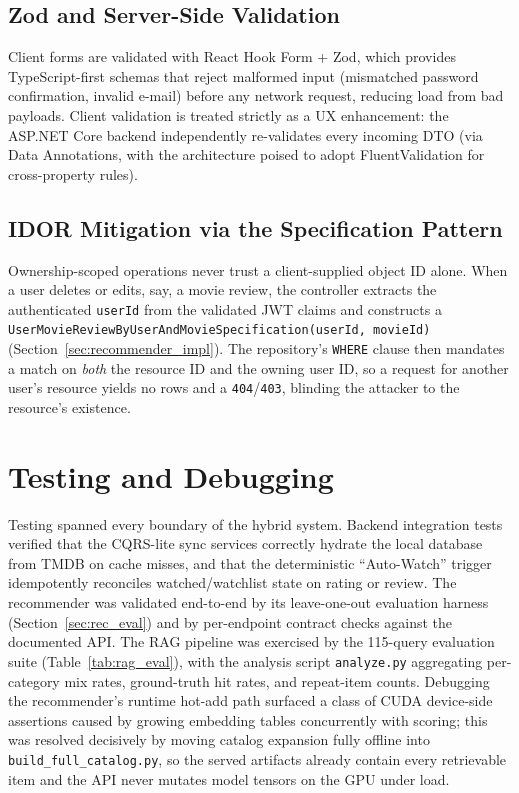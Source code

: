 \subsection{Zod and Server-Side Validation}
Client forms are validated with React Hook Form + Zod, which provides TypeScript-first schemas that reject malformed input (mismatched password confirmation, invalid e-mail) before any network request, reducing load from bad payloads. Client validation is treated strictly as a UX enhancement: the ASP.NET Core backend independently re-validates every incoming DTO (via Data Annotations, with the architecture poised to adopt FluentValidation for cross-property rules).

\subsection{IDOR Mitigation via the Specification Pattern}
Ownership-scoped operations never trust a client-supplied object ID alone. When a user deletes or edits, say, a movie review, the controller extracts the authenticated \texttt{userId} from the validated JWT claims and constructs a \texttt{UserMovieReviewByUserAndMovieSpecification(userId, movieId)} (Section~\ref{sec:recommender_impl}). The repository's \texttt{WHERE} clause then mandates a match on \emph{both} the resource ID and the owning user ID, so a request for another user's resource yields no rows and a \texttt{404}/\texttt{403}, blinding the attacker to the resource's existence.

\section{Testing and Debugging}
Testing spanned every boundary of the hybrid system. Backend integration tests verified that the CQRS-lite sync services correctly hydrate the local database from TMDB on cache misses, and that the deterministic ``Auto-Watch'' trigger idempotently reconciles watched/watchlist state on rating or review. The recommender was validated end-to-end by its leave-one-out evaluation harness (Section~\ref{sec:rec_eval}) and by per-endpoint contract checks against the documented API. The RAG pipeline was exercised by the 115-query evaluation suite (Table~\ref{tab:rag_eval}), with the analysis script \texttt{analyze.py} aggregating per-category mix rates, ground-truth hit rates, and repeat-item counts. Debugging the recommender's runtime hot-add path surfaced a class of CUDA device-side assertions caused by growing embedding tables concurrently with scoring; this was resolved decisively by moving catalog expansion fully offline into \texttt{build\_full\_catalog.py}, so the served artifacts already contain every retrievable item and the API never mutates model tensors on the GPU under load.

